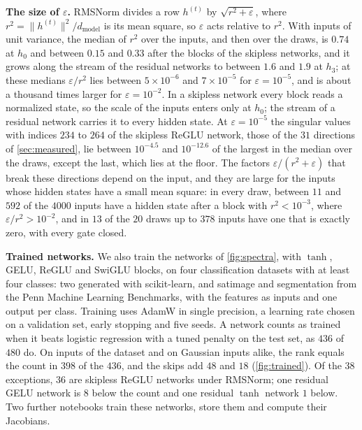 \documentclass[10pt]{article}
\theoremstyle{definition}
\theoremstyle{remark}
\newcommand{\dm}{d_{\mathrm{model}}}
\newcommand{\norm}[1]{\lVert #1\rVert}
\newcommand{\para}[1]{\smallskip\noindent\textbf{#1}\hspace{0.5em}}
\begin{document}
\para{The size of $\varepsilon$.} RMSNorm divides a row $h^{(t)}$ by $\sqrt{r^2 + \varepsilon}$, where $r^2 = \norm{h^{(t)}}^2/\dm$ is its mean square, so $\varepsilon$ acts relative to $r^2$. With inputs of unit variance, the median of $r^2$ over the inputs, and then over the draws, is $0.74$ at $h_0$ and between $0.15$ and $0.33$ after the blocks of the skipless networks, and it grows along the stream of the residual networks to between $1.6$ and $1.9$ at $h_3$; at these medians $\varepsilon/r^2$ lies between $5\times10^{-6}$ and $7\times10^{-5}$ for $\varepsilon = 10^{-5}$, and is about a thousand times larger for $\varepsilon = 10^{-2}$. In a skipless network every block reads a normalized state, so the scale of the inputs enters only at $h_0$; the stream of a residual network carries it to every hidden state. At $\varepsilon = 10^{-5}$ the singular values with indices $234$ to $264$ of the skipless ReGLU network, those of the $31$ directions of \cref{sec:measured}, lie between $10^{-4.5}$ and $10^{-12.6}$ of the largest in the median over the draws, except the last, which lies at the floor. The factors $\varepsilon/(r^2 + \varepsilon)$ that break these directions depend on the input, and they are large for the inputs whose hidden states have a small mean square: in every draw, between $11$ and $592$ of the $4000$ inputs have a hidden state after a block with $r^2 < 10^{-3}$, where $\varepsilon/r^2 > 10^{-2}$, and in $13$ of the $20$ draws up to $378$ inputs have one that is exactly zero, with every gate closed.

\para{Trained networks.} We also train the networks of \cref{fig:spectra}, with $\tanh$, GELU, ReGLU and SwiGLU blocks, on four classification datasets with at least four classes: two generated with scikit-learn, and satimage and segmentation from the Penn Machine Learning Benchmarks, with the features as inputs and one output per class. Training uses AdamW in single precision, a learning rate chosen on a validation set, early stopping and five seeds. A network counts as trained when it beats logistic regression with a tuned penalty on the test set, as $436$ of $480$ do. On inputs of the dataset and on Gaussian inputs alike, the rank equals the count in $398$ of the $436$, and the skips add $48$ and $18$ (\cref{fig:trained}). Of the $38$ exceptions, $36$ are skipless ReGLU networks under RMSNorm; one residual GELU network is $8$ below the count and one residual $\tanh$ network $1$ below. Two further notebooks train these networks, store them and compute their Jacobians.
\end{document}
